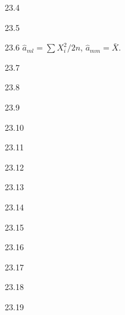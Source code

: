 \protect \hypertarget {soln:23.4}{}
\begin{solution}{{23.4}}
\end{solution}
\protect \hypertarget {soln:23.5}{}
\begin{solution}{{23.5}}
\end{solution}
\protect \hypertarget {soln:23.6}{}
\begin{solution}{{23.6}}
$\hat{a}_{ml}=\sum X_i^2/2n$, $\hat{a}_{mm}=\bar{X}$.
\end{solution}
\protect \hypertarget {soln:23.7}{}
\begin{solution}{{23.7}}
\end{solution}
\protect \hypertarget {soln:23.8}{}
\begin{solution}{{23.8}}
\end{solution}
\protect \hypertarget {soln:23.9}{}
\begin{solution}{{23.9}}
\end{solution}
\protect \hypertarget {soln:23.10}{}
\begin{solution}{{23.10}}
\end{solution}
\protect \hypertarget {soln:23.11}{}
\begin{solution}{{23.11}}
\end{solution}
\protect \hypertarget {soln:23.12}{}
\begin{solution}{{23.12}}
\end{solution}
\protect \hypertarget {soln:23.13}{}
\begin{solution}{{23.13}}
\end{solution}
\protect \hypertarget {soln:23.14}{}
\begin{solution}{{23.14}}
\end{solution}
\protect \hypertarget {soln:23.15}{}
\begin{solution}{{23.15}}
\end{solution}
\protect \hypertarget {soln:23.16}{}
\begin{solution}{{23.16}}
\end{solution}
\protect \hypertarget {soln:23.17}{}
\begin{solution}{{23.17}}
\end{solution}
\protect \hypertarget {soln:23.18}{}
\begin{solution}{{23.18}}
\end{solution}
\protect \hypertarget {soln:23.19}{}
\begin{solution}{{23.19}}
\end{solution}
\protect \hypertarget {soln:23.20}{}
